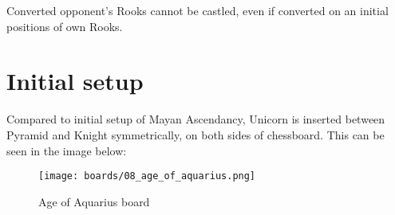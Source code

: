 Converted opponent's Rooks cannot be castled, even if converted on an initial positions
of own Rooks.

\clearpage %

\section*{Initial setup}

Compared to initial setup of Mayan Ascendancy, Unicorn is inserted between Pyramid and Knight
symmetrically, on both sides of chessboard. This can be seen in the image below:

\noindent
\begin{figure}[h]
\texttt{[image: boards/08\_age\_of\_aquarius.png]}
\caption{Age of Aquarius board}
\label{fig:08_age_of_aquarius}
\end{figure}

\clearpage %
